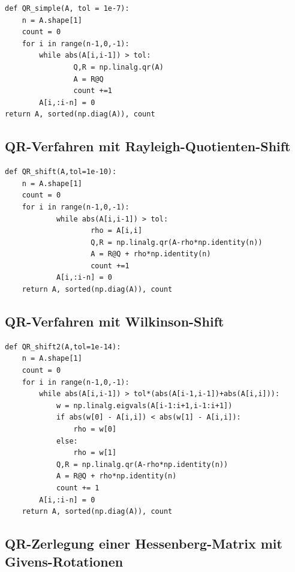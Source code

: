\documentclass{article}
\theoremstyle{plain}
\begin{document}
\begin{lstlisting}
def QR_simple(A, tol = 1e-7):
	n = A.shape[1]
	count = 0
	for i in range(n-1,0,-1):
		while abs(A[i,i-1]) > tol:
				Q,R = np.linalg.qr(A)
				A = R@Q
				count +=1
		A[i,:i-n] = 0
return A, sorted(np.diag(A)), count
\end{lstlisting}



\subsection*{QR-Verfahren mit Rayleigh-Quotienten-Shift}
\begin{lstlisting}
def QR_shift(A,tol=1e-10):
	n = A.shape[1]
	count = 0
	for i in range(n-1,0,-1):
			while abs(A[i,i-1]) > tol:
					rho = A[i,i]
					Q,R = np.linalg.qr(A-rho*np.identity(n))
					A = R@Q + rho*np.identity(n)
					count +=1
			A[i,:i-n] = 0
	return A, sorted(np.diag(A)), count
\end{lstlisting}


\subsection*{QR-Verfahren mit Wilkinson-Shift}


\begin{lstlisting}
def QR_shift2(A,tol=1e-14):
    n = A.shape[1]
    count = 0
    for i in range(n-1,0,-1):
        while abs(A[i,i-1]) > tol*(abs(A[i-1,i-1])+abs(A[i,i])):
            w = np.linalg.eigvals(A[i-1:i+1,i-1:i+1])
            if abs(w[0] - A[i,i]) < abs(w[1] - A[i,i]):
                rho = w[0]
            else:
                rho = w[1]
            Q,R = np.linalg.qr(A-rho*np.identity(n))
            A = R@Q + rho*np.identity(n)
            count += 1
        A[i,:i-n] = 0
    return A, sorted(np.diag(A)), count
\end{lstlisting}

\newpage
\subsection*{QR-Zerlegung einer Hessenberg-Matrix mit Givens-Rotationen}

\end{document}
